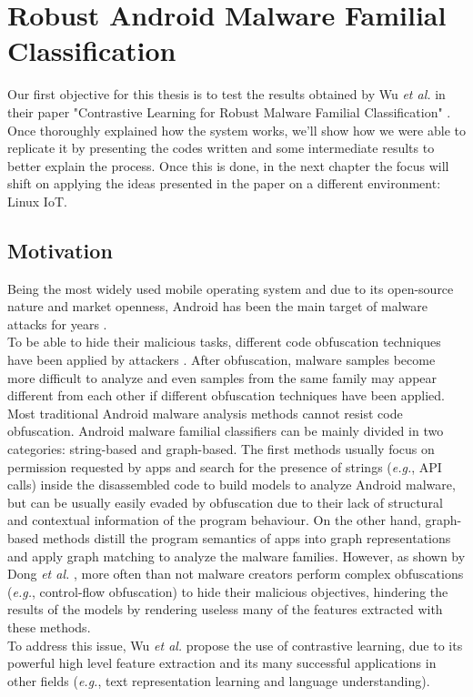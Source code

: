 \chapter{Robust Android Malware Familial Classification}
\thispagestyle{chapterfancy}


Our first objective for this thesis is to test the results obtained by Wu \textit{et al.} in their paper "Contrastive Learning for Robust Malware Familial Classification" \cite{wu2022contrastive}. \\
Once thoroughly explained how the system works, we'll show how we were able to replicate it by presenting the codes written and some intermediate  results to better explain the process. Once this is done, in the next chapter the focus will shift on applying the ideas presented in the paper on a different environment: Linux IoT.

\section{Motivation}

Being the most widely used mobile operating system and due to its open-source nature and market openness, Android has been the main target of malware attacks for years \cite{kivva2023itthreat}. \\
To be able to hide their malicious tasks, different code obfuscation techniques have been applied by attackers \cite{dong2018understanding}. After obfuscation, malware samples become more difficult to analyze and even samples from the same family may appear different from each other if different obfuscation techniques have been applied. \\
Most traditional Android malware analysis methods cannot resist code obfuscation. Android malware familial classifiers can be mainly divided in two categories: string-based and graph-based. The first methods usually focus on permission requested by apps and search for the presence of strings (\textit{e.g.}, API calls) inside the disassembled code to build models to analyze Android malware, but can be usually easily evaded by obfuscation due to their lack of structural and contextual information of the program behaviour. On the other hand, graph-based methods distill the program semantics of apps into graph representations and apply graph matching to analyze the malware families. However, as shown by Dong \textit{et al.} \cite{dong2018understanding}, more often than not malware creators perform complex obfuscations (\textit{e.g.}, control-flow obfuscation) to hide their malicious objectives, hindering the results of the models by rendering useless many of the features extracted with these methods. \\
To address this issue, Wu \textit{et al.} \cite{wu2022contrastive} propose the use of contrastive learning, due to its powerful high level feature extraction and its many successful applications in other fields (\textit{e.g.}, text representation learning and language understanding). 

